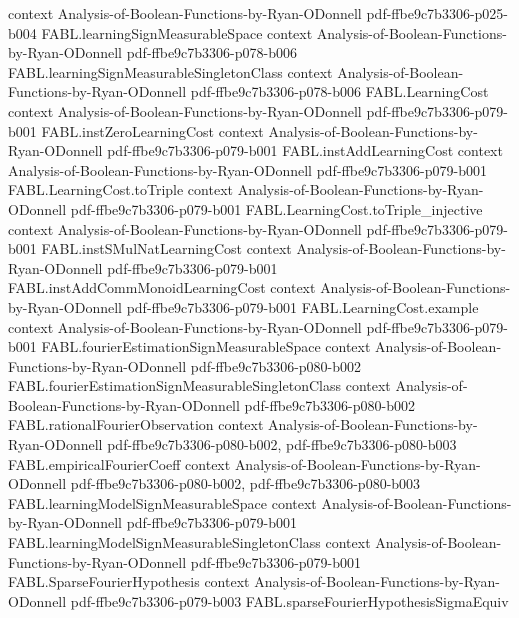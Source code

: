 \begin{theorem}
  {context}
  {Analysis-of-Boolean-Functions-by-Ryan-ODonnell}
  {pdf-ffbe9c7b3306-p025-b004}
\proofstep
  {FABL.learningSignMeasurableSpace}
  {context}
  {Analysis-of-Boolean-Functions-by-Ryan-ODonnell}
  {pdf-ffbe9c7b3306-p078-b006}
\proofstep
  {FABL.learningSignMeasurableSingletonClass}
  {context}
  {Analysis-of-Boolean-Functions-by-Ryan-ODonnell}
  {pdf-ffbe9c7b3306-p078-b006}
\proofstep
  {FABL.LearningCost}
  {context}
  {Analysis-of-Boolean-Functions-by-Ryan-ODonnell}
  {pdf-ffbe9c7b3306-p079-b001}
\proofstep
  {FABL.instZeroLearningCost}
  {context}
  {Analysis-of-Boolean-Functions-by-Ryan-ODonnell}
  {pdf-ffbe9c7b3306-p079-b001}
\proofstep
  {FABL.instAddLearningCost}
  {context}
  {Analysis-of-Boolean-Functions-by-Ryan-ODonnell}
  {pdf-ffbe9c7b3306-p079-b001}
\proofstep
  {FABL.LearningCost.toTriple}
  {context}
  {Analysis-of-Boolean-Functions-by-Ryan-ODonnell}
  {pdf-ffbe9c7b3306-p079-b001}
\proofstep
  {FABL.LearningCost.toTriple_injective}
  {context}
  {Analysis-of-Boolean-Functions-by-Ryan-ODonnell}
  {pdf-ffbe9c7b3306-p079-b001}
\proofstep
  {FABL.instSMulNatLearningCost}
  {context}
  {Analysis-of-Boolean-Functions-by-Ryan-ODonnell}
  {pdf-ffbe9c7b3306-p079-b001}
\proofstep
  {FABL.instAddCommMonoidLearningCost}
  {context}
  {Analysis-of-Boolean-Functions-by-Ryan-ODonnell}
  {pdf-ffbe9c7b3306-p079-b001}
\proofstep
  {FABL.LearningCost.example}
  {context}
  {Analysis-of-Boolean-Functions-by-Ryan-ODonnell}
  {pdf-ffbe9c7b3306-p079-b001}
\proofstep
  {FABL.fourierEstimationSignMeasurableSpace}
  {context}
  {Analysis-of-Boolean-Functions-by-Ryan-ODonnell}
  {pdf-ffbe9c7b3306-p080-b002}
\proofstep
  {FABL.fourierEstimationSignMeasurableSingletonClass}
  {context}
  {Analysis-of-Boolean-Functions-by-Ryan-ODonnell}
  {pdf-ffbe9c7b3306-p080-b002}
\proofstep
  {FABL.rationalFourierObservation}
  {context}
  {Analysis-of-Boolean-Functions-by-Ryan-ODonnell}
  {pdf-ffbe9c7b3306-p080-b002,
    pdf-ffbe9c7b3306-p080-b003}
\proofstep
  {FABL.empiricalFourierCoeff}
  {context}
  {Analysis-of-Boolean-Functions-by-Ryan-ODonnell}
  {pdf-ffbe9c7b3306-p080-b002,
    pdf-ffbe9c7b3306-p080-b003}
\proofstep
  {FABL.learningModelSignMeasurableSpace}
  {context}
  {Analysis-of-Boolean-Functions-by-Ryan-ODonnell}
  {pdf-ffbe9c7b3306-p079-b001}
\proofstep
  {FABL.learningModelSignMeasurableSingletonClass}
  {context}
  {Analysis-of-Boolean-Functions-by-Ryan-ODonnell}
  {pdf-ffbe9c7b3306-p079-b001}
\proofstep
  {FABL.SparseFourierHypothesis}
  {context}
  {Analysis-of-Boolean-Functions-by-Ryan-ODonnell}
  {pdf-ffbe9c7b3306-p079-b003}
\proofstep
  {FABL.sparseFourierHypothesisSigmaEquiv}

\end{theorem}
